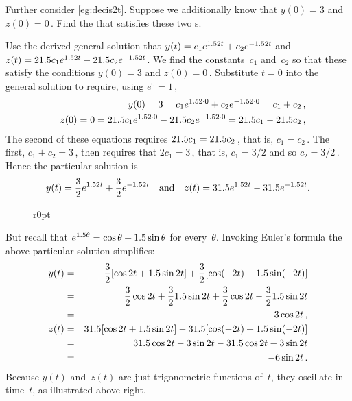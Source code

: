 \begin{example} \label{eg:decis2tb} 
Further consider \cref{eg:decis2t}.
Suppose we additionally know that \(y(0)=3\) and \(z(0)=0\)\,.  
Find the  that satisfies these two s.
\begin{solution} 
Use the derived general solution that \(y(t)=c_1e^{1.52t}+c_2e^{-1.52t}\) and \(z(t)=21.5 c_1e^{1.52t}-21.5 c_2e^{-1.52t}\).
We find the constants~\(c_1\) and~\(c_2\) so that these satisfy the  conditions \(y(0)=3\) and \(z(0)=0\)\,.
Substitute \(t=0\) into the general solution to require, using \(e^0=1\)\,,
\begin{eqnarray*}
&&y(0)=3=c_1e^{1.52\cdot0}+c_2e^{-1.52\cdot0}=c_1+c_2\,,
\\&&z(0)=0=21.5 c_1e^{1.52\cdot0}-21.5 c_2e^{-1.52\cdot0}=21.5 c_1-21.5 c_2\,,
\end{eqnarray*}
The second of these equations requires \(21.5 c_1=21.5 c_2\)\,, that is, \(c_1=c_2\)\,.
The first, \(c_1+c_2=3\)\,, then requires that \(2c_1=3\)\,, that is, \(c_1=3/2\) and so \(c_2=3/2\)\,.
Hence the particular solution is
\begin{equation*}
y(t)=\frac32e^{1.52t}+\frac32e^{-1.52t} 
\quad\text{and}\quad
z(t)=31.5 e^{1.52t}-31.5 e^{-1.52t}.
\end{equation*}

\begin{wrapfigure}r{0pt}
\end{wrapfigure}
But recall  that \(e^{1.5\theta}=\cos\theta+1.5\sin\theta\) for every~\(\theta\).
Invoking Euler's formula the above particular solution simplifies:
\begin{eqnarray*}
y(t)&=&\frac32[\cos2t+1.5\sin2t]+\frac32[\cos(-2t)+1.5\sin(-2t)]
\\&=&\frac32\cos2t+\frac321.5\sin2t+\frac32\cos2t-\frac321.5\sin2t
\\&=&3\cos2t\,,
\\z(t)&=&31.5[\cos2t+1.5\sin2t]-31.5[\cos(-2t)+1.5\sin(-2t)]
\\&=&31.5\cos2t-3\sin2t-31.5\cos2t-3\sin2t
\\&=&-6\sin2t\,.
\end{eqnarray*}
Because \(y(t)\) and~\(z(t)\) are just trigonometric functions of~\(t\), they oscillate in time~\(t\), as illustrated above-right.
\end{solution}
\end{example}



